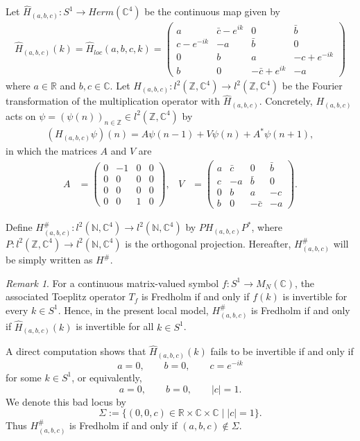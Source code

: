 \documentclass{amsart}
\theoremstyle{definition}
\theoremstyle{remark}
\newtheorem{rem}[thm]{Remark}
\newcommand{\C}{\mathbb{C}}
\newcommand{\R}{\mathbb{R}}
\begin{document}
Let $\hat{H}_{(a, b, c)} \colon S^1 \to Herm(\mathbb{C}^4)$ be the continuous map given by
\begin{align*}
\hat{H}_{(a, b, c)}(k)=\hat{H}_{loc}(a,b,c,k)=\begin{pmatrix}
   a & \bar{c}-e^{ik} & 0 & \bar{b} \\
   c-e^{-ik} & -a & \bar{b} & 0 \\
   0 & b & a & -c+e^{-ik} \\
   b & 0 & -\bar{c}+e^{ik} & -a
\end{pmatrix}
\end{align*}
where $a\in \mathbb{R}$ and $b, c \in \mathbb{C}.$ Let $H_{(a, b, c)} \colon l^2(\mathbb{Z}, \mathbb{C}^4)\to l^2(\mathbb{Z}, \mathbb{C}^4)$ be the Fourier transformation of the multiplication operator with $\hat{H}_{(a,b,c)}$.
Concretely, $H_{(a, b, c)}$ acts on $\psi = (\psi(n))_{n \in \mathbb{Z}}\in l^2(\mathbb{Z},\mathbb{C}^4)$ by 
\begin{align*}
(H_{(a, b, c)}\psi)(n)=A\psi(n-1)+V\psi(n)+A^*\psi(n+1),
\end{align*}
in which the matrices $A$ and $V$ are 
\begin{align*}
A& = \begin{pmatrix}
   0 & -1 & 0 & 0 \\
   0 & 0 & 0 & 0 \\
   0 & 0 & 0 & 0 \\
   0 & 0 & 1& 0
\end{pmatrix},
&V& = \begin{pmatrix}a & \bar{c}& 0 & \bar{b} \\
   c & -a & \bar{b} & 0 \\
   0 & b & a & -c \\
   b & 0 & -\bar{c} & -a
   \end{pmatrix}.
   \end{align*}

   Define $H_{(a, b, c)}^{\#} \colon l^2(\mathbb{N}, \mathbb{C}^4) \to l^2(\mathbb{N}, \mathbb{C}^4)$ by $PH_{(a, b, c)}P^*$, 
where $P \colon l^2(\mathbb{Z}, \mathbb{C}^4) \to l^2(\mathbb{N}, \mathbb{C}^4)$ is the orthogonal projection. Hereafter, $H^{\#}_{(a,b,c)}$ will be simply written as $H^{\#}$.

\begin{rem}\label{rem:fredholm-criterion-local-model}
For a continuous matrix-valued symbol $f\colon S^1\to M_N(\C)$, the associated Toeplitz operator
$T_f$ is Fredholm if and only if $f(k)$ is invertible for every $k\in S^1$.
Hence, in the present local model, $H^\#_{(a,b,c)}$ is Fredholm if and only if
$\hat H_{(a,b,c)}(k)$ is invertible for all $k\in S^1$.

A direct computation shows that $\hat H_{(a,b,c)}(k)$ fails to be invertible if and only if
\[
a=0,\qquad b=0,\qquad c=e^{-ik}
\]
for some $k\in S^1$, or equivalently,
\[
a=0,\qquad b=0,\qquad |c|=1.
\]
We denote this bad locus by
\[
\Sigma:=\{(0,0,c)\in \R\times \C\times \C\mid |c|=1\}.
\]
Thus $H^\#_{(a,b,c)}$ is Fredholm if and only if $(a,b,c)\notin \Sigma$.
\end{rem}
\end{document}
